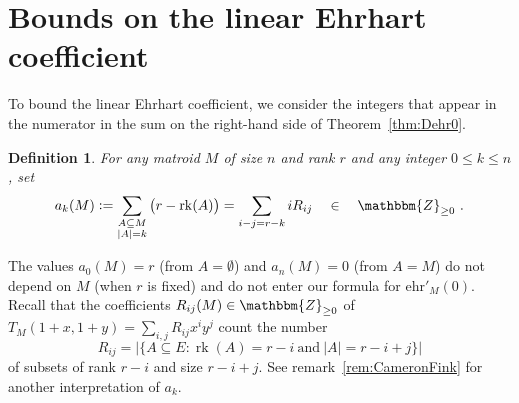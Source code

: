 \documentclass[pagesize,paper=A4,11pt,bibliography=totoc,oneside]{scrartcl}
\newtheorem{definition}[thm]{Definition}
\newcommand{\ZZ}{\mathbbm{Z}}
\newcommand{\defas}{\mathrel{\mathop:}=}
\newcommand{\abs}[1]{\left|#1\right|}
\DeclareMathOperator{\rk}{rk}
\newcommand{\ehr}{\mathrm{ehr}}
\newcommand{\Tutte}{T}
\begin{document}
\section{Bounds on the linear Ehrhart coefficient}\label{sec:bounds}
To bound the linear Ehrhart coefficient, we consider the integers that appear in the numerator in the sum on the right-hand side of Theorem~\ref{thm:Dehr0}.
\begin{definition}\label{def:ak}
    For any matroid $M$ of size $n$ and rank $r$ and any integer $0\leq k\leq n$, set
\begin{equation}\label{eq:ak}
    a_k(M)\defas\sum_{\substack{A \subseteq M\\ \abs{A}=k}} \big(r-\rk(A)\big)=\sum_{i-j=r-k} i R_{ij}
    \quad\in\quad\ZZ_{\geq0} \ .
\end{equation}
\end{definition}
The values $a_0(M)=r$ (from $A=\emptyset$) and $a_n(M)=0$ (from $A=M$) do not depend on $M$ (when $r$ is fixed) and do not enter our formula for $\ehr'_M(0)$. Recall that the coefficients $R_{ij}(M)\in\ZZ_{\geq0}$ of $\Tutte_M(1+x,1+y)=\sum_{i,j} R_{ij} x^i y^j$ count the number
\begin{equation*}
    R_{ij}=\abs{\{A\subseteq E\colon \rk(A)=r-i\ \text{and}\ \abs{A}=r-i+j\}}
\end{equation*}
of subsets of rank $r-i$ and size $r-i+j$. See remark~\ref{rem:CameronFink} for another interpretation of $a_k$.
\end{document}
